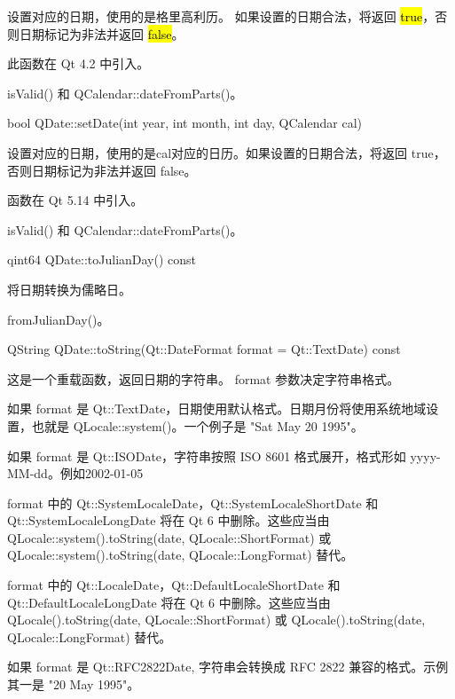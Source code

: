 设置对应的日期，使用的是格里高利历。 如果设置的日期合法，将返回
\hl{true}，否则日期标记为非法并返回 \hl{false}。

此函数在 Qt 4.2 中引入。


\begin{notice}[另请参阅]
isValid() 和 QCalendar::dateFromParts()。
\end{notice}

\splitLine

bool QDate::setDate(int year, int month, int day, QCalendar cal)

设置对应的日期，使用的是cal对应的日历。如果设置的日期合法，将返回 true，否则日期标记为非法并返回 false。

函数在 Qt 5.14 中引入。



\begin{notice}[另请参阅]
isValid() 和 QCalendar::dateFromParts()。
\end{notice}

\splitLine

qint64 QDate::toJulianDay() const

将日期转换为儒略日。


\begin{notice}[另请参阅]
fromJulianDay()。
\end{notice}

\splitLine

QString QDate::toString(Qt::DateFormat format = Qt::TextDate) const

这是一个重载函数，返回日期的字符串。 format 参数决定字符串格式。

如果 format 是 Qt::TextDate，日期使用默认格式。日期月份将使用系统地域设置，也就是 QLocale::system()。一个例子是 "Sat May 20 1995"。

如果 format 是 Qt::ISODate，字符串按照 ISO 8601 格式展开，格式形如 yyyy-MM-dd。例如2002-01-05

format 中的 Qt::SystemLocaleDate，Qt::SystemLocaleShortDate 和Qt::SystemLocaleLongDate 将在 Qt 6 中删除。这些应当由 QLocale::system().toString(date, QLocale::ShortFormat) 或 QLocale::system().toString(date, QLocale::LongFormat) 替代。

format 中的 Qt::LocaleDate，Qt::DefaultLocaleShortDate 和Qt::DefaultLocaleLongDate 将在 Qt 6 中删除。这些应当由 QLocale().toString(date, QLocale::ShortFormat) 或 QLocale().toString(date, QLocale::LongFormat) 替代。

如果 format 是 Qt::RFC2822Date, 字符串会转换成 RFC 2822 兼容的格式。示例其一是 "20 May 1995"。

